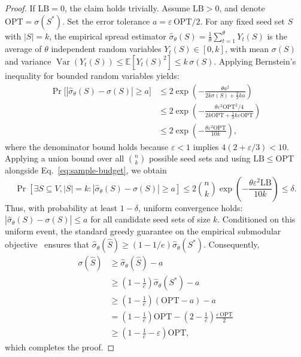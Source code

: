 \documentclass[sigconf]{acmart}
\begin{document}
\begin{proof}
If $\mathrm{LB}=0$, the claim holds trivially.
Assume $\mathrm{LB} > 0$, and denote $\mathrm{OPT} = \sigma(S^*)$.
Set the error tolerance $a = \varepsilon\,\mathrm{OPT}/2$.
For any fixed seed set $S$ with $|S|=k$, the empirical spread estimator
$\hat{\sigma}_\theta(S) = \frac{1}{\theta}\sum_{t=1}^\theta Y_t(S)$ is the average
of $\theta$ independent random variables $Y_t(S) \in [0,k]$, with mean $\sigma(S)$
and variance $\operatorname{Var}(Y_t(S)) \le \mathbb{E}[Y_t(S)^2] \le k\,\sigma(S)$.
Applying Bernstein's inequality for bounded random variables yields:
\begin{align}
\label{eq:bernstein}
  \Pr\bigl[|\hat{\sigma}_\theta(S) - \sigma(S)| \ge a\bigr]
  &\le
  2\exp\!\left(
    -\frac{\theta a^2}{2k\sigma(S) + \frac{2}{3}ka}
  \right) \nonumber\\
  &\le
  2\exp\!\left(
    -\frac{\theta \varepsilon^2 \mathrm{OPT}^2 / 4}{2k\mathrm{OPT} + \frac{1}{3}k\varepsilon\mathrm{OPT}}
  \right) \nonumber\\
  &\le
  2\exp\!\left(
    -\frac{\theta \varepsilon^2 \mathrm{OPT}}{10k}
  \right),
\end{align}
where the denominator bound holds because $\varepsilon < 1$ implies
$4(2 + \varepsilon/3) < 10$.
Applying a union bound over all $\binom{n}{k}$ possible seed sets and using
$\mathrm{LB} \le \mathrm{OPT}$ alongside Eq.~\eqref{eq:sample-budget}, we obtain
\[
  \Pr\left[\exists S \subseteq V, |S|=k : |\hat{\sigma}_\theta(S) - \sigma(S)| \ge a\right]
  \le
  2\binom{n}{k} \exp\!\left(-\frac{\theta \varepsilon^2 \mathrm{LB}}{10k}\right)
  \le \delta.
\]
Thus, with probability at least $1-\delta$, uniform convergence holds:
$|\hat{\sigma}_\theta(S) - \sigma(S)| \le a$ for all candidate seed sets of size $k$.
Conditioned on this uniform event, the standard greedy guarantee on the
empirical submodular objective~\cite{nemhauser1978analysis} ensures that
$\hat{\sigma}_\theta(\hat{S}) \ge (1-1/e)\hat{\sigma}_\theta(S^*)$.
Consequently,
\begin{align*}
  \sigma(\hat{S})
  &\ge
  \hat{\sigma}_\theta(\hat{S}) - a \\
  &\ge
  \left(1 - \frac{1}{e}\right)\hat{\sigma}_\theta(S^*) - a \\
  &\ge
  \left(1 - \frac{1}{e}\right)(\mathrm{OPT} - a) - a \\
  &=
  \left(1 - \frac{1}{e}\right)\mathrm{OPT} - \left(2 - \frac{1}{e}\right)\frac{\varepsilon\,\mathrm{OPT}}{2} \\
  &\ge
  \left(1 - \frac{1}{e} - \varepsilon\right)\mathrm{OPT},
\end{align*}
which completes the proof.
\end{proof}
\end{document}
